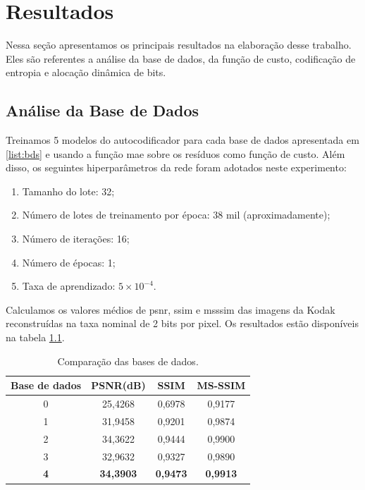 
\chapter{Resultados}
Nessa seção apresentamos os principais resultados na elaboração desse trabalho. Eles são referentes a análise da base de dados, da função de custo, codificação de entropia e alocação dinâmica de bits. 


\section{Análise da Base de Dados}

Treinamos 5 modelos do autocodificador para cada base de dados apresentada em \ref{list:bds} e usando a função \acrshort{mae} sobre os resíduos como função de custo. Além disso, os seguintes hiperparâmetros da rede foram adotados neste experimento: 

\begin{enumerate}
	\label{enum:hiper_param}
	\item Tamanho do lote: 32; 
	\item Número de lotes de treinamento por época: 38 mil (aproximadamente);   
	\item Número de iterações: 16;
	\item Número de épocas: 1;
	\item Taxa de aprendizado: $5 \times {10}^{-4}$.
\end{enumerate}

Calculamos os valores médios de \acrshort{psnr}, \acrshort{ssim} e \acrshort{msssim} das imagens da Kodak reconstruídas na taxa nominal de 2 bits por pixel. Os resultados estão disponíveis na tabela \ref{table:comp_datasets}.


\begin{table}[htbp]
	\centering
	\caption[Comparação das bases de dados]{Comparação das bases de dados.}
	\begin{tabular}{|c|c|c|c|}
		\hline
		\textbf{Base de dados} & \textbf{PSNR(dB)}    & \textbf{SSIM}   & \textbf{MS-SSIM}\\\hline
		0            & 25,4268          & 0,6978          & 0,9177           \\\hline
		1            & 31,9458          & 0,9201          & 0,9874           \\\hline
		2            & 34,3622          & 0,9444          & 0,9900           \\\hline
		3            & 32,9632	       & 0,9327          & 0,9890           \\\hline
		\textbf{4}            & \textbf{34,3903} & \textbf{0,9473} & \textbf{0,9913}     
		\\ \hline
	\end{tabular}
	\label{table:comp_datasets}
\end{table}


